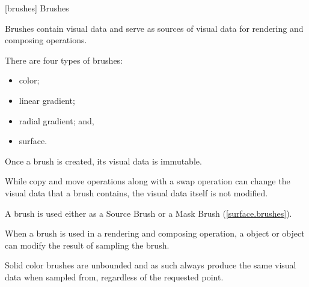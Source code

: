 
 [brushes] {Brushes}

\pnum
Brushes contain visual data and serve as sources of visual data for rendering and composing operations.

There are four types of brushes:
\begin{itemize}
	\item color;
	\item linear gradient;
	\item radial gradient; and,
	\item surface.
\end{itemize}

\pnum
Once a brush is created, its visual data is immutable.

\pnum
\enternote
While copy and move operations along with a swap operation can change the visual data that a brush contains, the visual data itself is not modified.
\exitnote

\pnum
A brush is used either as a Source Brush or a Mask Brush (\ref{surface.brushes}).

\pnum
When a brush is used in a rendering and composing operation, a  object or  object can modify the result of sampling the brush.

%
%
%
%
%
%
\pnum
Solid color brushes are unbounded and as such always produce the same visual data when sampled from, regardless of the requested point.

